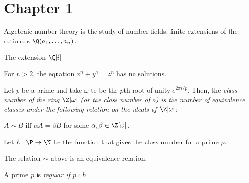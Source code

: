 \section{Chapter 1}

Algebraic number theory is the study of number fields: finite extensions of the rationals $\Q(a_1, \ldots, a_n)$.

\begin{example}
	The extension $\Q[i]$
\end{example}

\begin{theorem}
	For $n > 2$, the equation $x^n + y^n = z^n$ has no solutions.
\end{theorem}

\begin{definition}
	Let $p$ be a prime and take $\omega$ to be the $p$th root of unity $e^{2 \pi i / p}$.
	Then, the \em{class number} of the ring $\Z[\omega]$ (or the \em{class number} of $p$) is the number of equivalence classes under the following relation on the ideals of $\Z[\omega]$:
	\begin{center}
		$A \sim B$ iff $\alpha A = \beta B$ for some $\alpha, \beta \in \Z[\omega]$.
	\end{center}
	Let $h : \P \to \N$ be the function that gives the class number for a prime $p$.
\end{definition}

The relation $\sim$ above is an equivalence relation.

\begin{example}
\end{example}

\begin{definition}
	A prime $p$ is \em{regular} if $p \nmid h$
\end{definition}

\begin{definition}

\end{definition}


